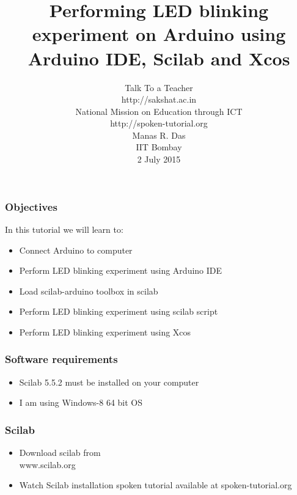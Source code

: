 \documentclass[17pt,xcolor=table]{beamer}
\begin{document}
\sffamily \bfseries
\title
[\scriptsize {Arduino access- IDE, Scilab \& Xcos}
\hspace{0.05cm}]
{\large{Performing LED blinking experiment on Arduino using Arduino IDE, Scilab and Xcos}}
\author [Manas R. Das]
{\small Talk To a Teacher \\http://sakshat.ac.in \\ National Mission on Education
  through ICT \\ http://spoken-tutorial.org \\ [0.2cm]
  Manas R. Das \\IIT Bombay \\ [0.1cm]
{\small 2 July 2015}}
\date{}
\begin{frame}
   \titlepage
\end{frame}

\begin{frame}[fragile]
\frametitle{Objectives}
In this tutorial we will learn to:
\begin{itemize}[<+-|alert@+>]
\item Connect Arduino to computer
\item Perform LED blinking experiment using Arduino IDE
\item Load scilab-arduino toolbox in scilab
\item Perform LED blinking experiment using scilab script
\item Perform LED blinking experiment using Xcos

\end{itemize}
\end{frame}

\begin{frame}
\frametitle{Software requirements}
\begin{itemize}[<+-|alert@+>]
\item Scilab 5.5.2 must be installed on your computer
\item I am using Windows-8 64 bit OS
\end{itemize}
\end{frame}

\begin{frame}
\frametitle{Scilab}
\begin{itemize}[<+-|alert@+>]
\item Download scilab from \\{\color{red} www.scilab.org}
\item Watch Scilab installation spoken tutorial available at {\color{red} spoken-tutorial.org}
\end{itemize}
\end{frame}
\end{document}
